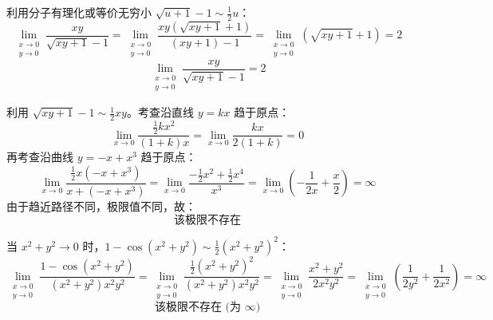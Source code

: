 \begin{solution}
    利用分子有理化或等价无穷小 $\sqrt{u+1}-1 \sim \frac{1}{2}u$：
    \begin{equation*}
        \lim_{\substack{x \to 0 \\ y \to 0}} \frac{xy}{\sqrt{xy+1}-1} = \lim_{\substack{x \to 0 \\ y \to 0}} \frac{xy(\sqrt{xy+1}+1)}{(xy+1)-1} = \lim_{\substack{x \to 0 \\ y \to 0}} (\sqrt{xy+1}+1) = 2
    \end{equation*}
    \begin{equation*}
        \boxed{\lim_{\substack{x \to 0 \\ y \to 0}} \frac{xy}{\sqrt{xy+1}-1} = 2}
    \end{equation*}

    利用 $\sqrt{xy+1}-1 \sim \frac{1}{2}xy$。考查沿直线 $y = kx$ 趋于原点：
    \begin{equation*}
        \lim_{x \to 0} \frac{\frac{1}{2}kx^2}{(1+k)x} = \lim_{x \to 0} \frac{kx}{2(1+k)} = 0
    \end{equation*}
    再考查沿曲线 $y = -x + x^3$ 趋于原点：
    \begin{equation*}
        \lim_{x \to 0} \frac{\frac{1}{2}x(-x+x^3)}{x+(-x+x^3)} = \lim_{x \to 0} \frac{-\frac{1}{2}x^2 + \frac{1}{2}x^4}{x^3} = \lim_{x \to 0} \left( -\frac{1}{2x} + \frac{x}{2} \right) = \infty
    \end{equation*}
    由于趋近路径不同，极限值不同，故：
    \begin{equation*}
        \boxed{\text{该极限不存在}}
    \end{equation*}

    当 $x^2 + y^2 \to 0$ 时，$1 - \cos(x^2+y^2) \sim \frac{1}{2}(x^2+y^2)^2$：
    \begin{equation*}
        \lim_{\substack{x \to 0 \\ y \to 0}} \frac{1-\cos(x^2+y^2)}{(x^2+y^2)x^2y^2} = \lim_{\substack{x \to 0 \\ y \to 0}} \frac{\frac{1}{2}(x^2+y^2)^2}{(x^2+y^2)x^2y^2} = \lim_{\substack{x \to 0 \\ y \to 0}} \frac{x^2+y^2}{2x^2y^2} = \lim_{\substack{x \to 0 \\ y \to 0}} \left( \frac{1}{2y^2} + \frac{1}{2x^2} \right) = \infty
    \end{equation*}
    \begin{equation*}
        \boxed{\text{该极限不存在 (为 } \infty \text{)}}
    \end{equation*}


\end{solution}
